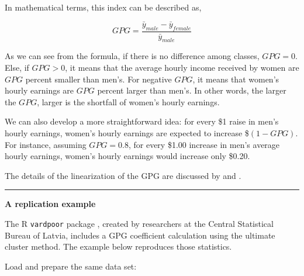 \documentclass[
]{book}
\begin{document}
In mathematical terms, this index can be described as,

\[ GPG = \frac{ \bar{y}_{male} - \bar{y}_{female} }{ \bar{y}_{male} } \]

As we can see from the formula, if there is no difference among classes, \(GPG = 0\). Else, if \(GPG > 0\), it means that the average hourly income received by women are \(GPG\) percent smaller than men's. For negative \(GPG\), it means that women's hourly earnings are \(GPG\) percent larger than men's. In other words, the larger the \(GPG\), larger is the shortfall of women's hourly earnings.

We can also develop a more straightforward idea: for every \$1 raise in men's hourly earnings, women's hourly earnings are expected to increase \$\((1-GPG)\). For instance, assuming \(GPG = 0.8\), for every \$1.00 increase in men's average hourly earnings, women's hourly earnings would increase only \$0.20.

The details of the linearization of the GPG are discussed by \textcite{deville1999} and \textcite{osier2009}.

\begin{center}\rule{0.5\linewidth}{0.5pt}\end{center}

\textbf{A replication example}

The R \texttt{vardpoor} package \autocite{vardpoor}, created by researchers at the Central Statistical Bureau of Latvia, includes a GPG coefficient calculation using the ultimate cluster method. The example below reproduces those statistics.

Load and prepare the same data set:
\end{document}
